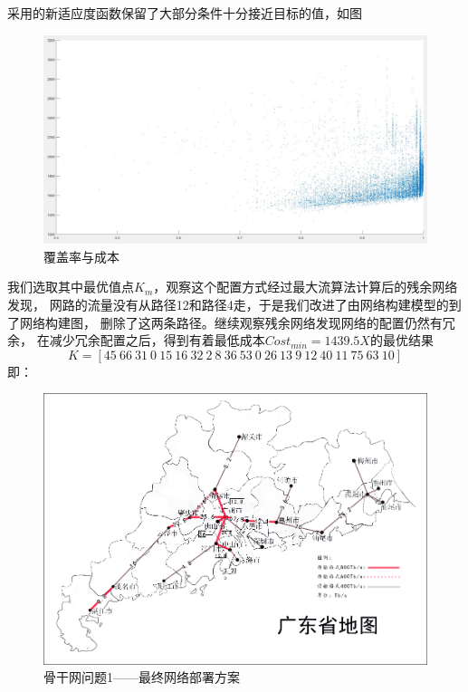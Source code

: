 \documentclass[UTF8,12pt]{ctexart}
\begin{document}
     采用的新适应度函数保留了大部分条件十分接近目标的值，如图
     \begin{figure}[H]
        \centering
        \includegraphics[scale=0.2]{cos.jpg}
        \caption{覆盖率与成本}
        \end{figure} 
     我们选取其中最优值点$K_m$，观察这个配置方式经过最大流算法计算后的残余网络发现，
     网路的流量没有从路径12和路径4走，于是我们改进了由网络构建模型的到了网络构建图，
     删除了这两条路径。继续观察残余网络发现网络的配置仍然有冗余，
     在减少冗余配置之后，得到有着最低成本$Cost_{min}=1439.5X$的最优结果
            $$K=[45~66~31~0~15~16~32~2~8~36~53~0~26~13~9~12~40~11~75~63~10]$$
            即：\par
            \begin{figure}[H]
                \centering
                \includegraphics[scale=0.4]{overG1.png}   %
                \caption{骨干网问题1——最终网络部署方案}
                \end{figure} 
\end{document}

